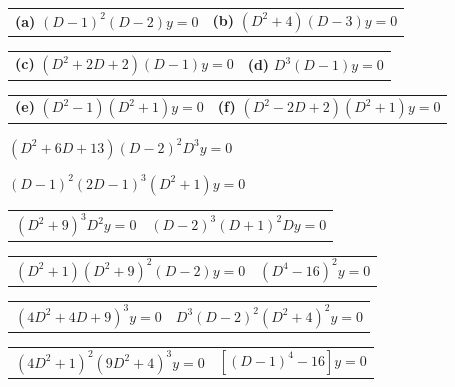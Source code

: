 \begin{exerciselist}
  \begin{tabular}[t]{@{}p{168pt}@{}p{168pt}}
    {\bf (a)} $(D-1)^{2}(D-2)y=0$ & {\bf (b)} $(D^{2}+4)(D-3)y=0$
  \end{tabular}

  \begin{tabular}[t]{@{}p{168pt}@{}p{168pt}}
    {\bf (c)} $(D^{2}+2D+2)(D-1)y=0$ & {\bf (d)} $D^{3}(D-1)y=0$
  \end{tabular}

  \begin{tabular}[t]{@{}p{168pt}@{}p{168pt}}
    {\bf (e)} $(D^{2}-1)(D^{2}+1)y=0$ & {\bf (f)} $(D^{2}-2D+2)(D^{2}+1)y=0$
  \end{tabular}


  \item\label{exer:9.2.29} $(D^{2}+6D+13)(D-2)^{2}D^{3}y=0$

  \item\label{exer:9.2.30} $(D-1)^{2}(2D-1)^{3}(D^{2}+1)y=0$

  \begin{tabular}[t]{@{}p{168pt}@{}p{168pt}}
    \item\label{exer:9.2.31} $(D^{2}+9)^{3}D^{2}y=0$ &
    \item\label{exer:9.2.32} $(D-2)^{3}(D+1)^{2}Dy=0$
  \end{tabular}

  \begin{tabular}[t]{@{}p{168pt}@{}p{168pt}}
    \item\label{exer:9.2.33} $(D^{2}+1)(D^{2}+9)^{2}(D-2)y=0$ &
    \item\label{exer:9.2.34} $(D^{4}-16)^{2}y=0$
  \end{tabular}

  \begin{tabular}[t]{@{}p{168pt}@{}p{168pt}}
    \item\label{exer:9.2.35} $(4D^{2}+4D+9)^{3}y=0$ &
    \item\label{exer:9.2.36} $D^{3}(D-2)^{2}(D^{2}+4)^{2}y=0$
  \end{tabular}

  \begin{tabular}[t]{@{}p{168pt}@{}p{168pt}}
    \item\label{exer:9.2.37} $(4D^{2}+1)^{2}(9D^{2}+4)^{3}y=0$ &
    \item\label{exer:9.2.38} $\left[(D-1)^{4}-16\right]y=0$
  \end{tabular}


\end{exerciselist}
